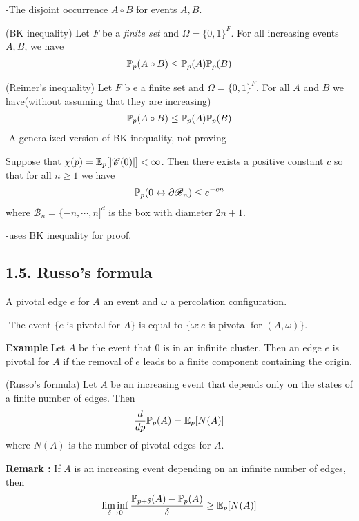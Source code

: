 \documentclass[10pt,a4paper]{report}
\begin{document}
-The disjoint occurrence $A\circ B$ for events $A,B$.
\s

(BK inequality) Let $F$ be a \emph{finite set} and $\Omega = \{0,1\}^F$. For all increasing events $A,B$, we have 
\begin{align*}
\mathbb{P}_p (A \circ B) \leq \mathbb{P}_p(A) \mathbb{P}_p(B)
\end{align*}
\s

(Reimer's inequality) Let $F$ b e a finite set and $\Omega = \{0,1\}^F$. For all $A$ and $B$ we have(without assuming that they are increasing)
\begin{align*}
\mathbb{P}_p (A \circ B) \leq \mathbb{P}_p(A) \mathbb{P}_p(B)
\end{align*}
-A generalized version of BK inequality, not proving
\s

 Suppose that $\chi(p) = \mathbb{E}_p [|\mathscr{C}(0)|]<\infty$. Then there exists a positive constant $c$ so that for all $n\geq 1$ we have
\begin{align*}
\mathbb{P}_p(0\leftrightarrow \partial \mathscr{B}_n) \leq e^{-cn}
\end{align*}
where $\mathscr{B}_n = \{-n,\cdots,n]^d$ is the box with diameter $2n+1$.

-uses BK inequality for proof.

\subsection*{1.5. Russo's formula}

 A pivotal edge $e$ for $A$ an event and $\omega$ a percolation configuration.

-The event $\{e$ is pivotal for $A \}$ is equal to $\{\omega : e$ is pivotal for $(A,\omega) \}$.
\s

\textbf{Example} Let $A$ be the event that $0$ is in an infinite cluster. Then an edge $e$ is pivotal for $A$ if the removal of $e$ leads to a finite component containing the origin.
\s

 (Russo's formula) Let $A$ be an increasing event that depends only on the states of a finite number of edges. Then
\begin{align*}
\frac{d}{dp} \mathbb{P}_p(A) = \mathbb{E}_p[N(A)]
\end{align*}
where $N(A)$ is the number of pivotal edges for $A$.

\s

\textbf{Remark :} If $A$ is an increasing event depending on an infinite number of edges, then
\begin{align*}
\liminf_{\delta \rightarrow 0} \frac{\mathbb{P}_{p+\delta}(A) - \mathbb{P}_p(A)}{\delta} \geq \mathbb{E}_p[N(A)]
\end{align*}
\end{document}
